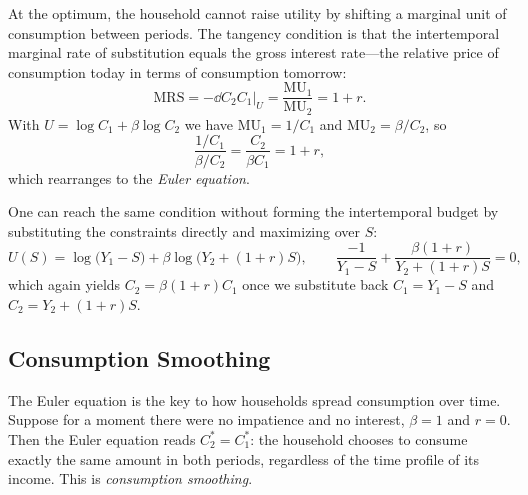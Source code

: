 At the optimum, the household cannot raise utility by shifting a marginal unit of consumption between periods. The tangency condition is that the intertemporal marginal rate of substitution equals the gross interest rate---the relative price of consumption today in terms of consumption tomorrow:
\[
\mathrm{MRS} = -\dd{C_2}{C_1}\bigg|_{U} = \frac{\mathrm{MU}_1}{\mathrm{MU}_2} = 1 + r.
\]
With $U = \log C_1 + \beta \log C_2$ we have $\mathrm{MU}_1 = 1/C_1$ and $\mathrm{MU}_2 = \beta/C_2$, so
\[
\frac{1/C_1}{\beta/C_2} = \frac{C_2}{\beta C_1} = 1 + r,
\]
which rearranges to the \emph{Euler equation}.



One can reach the same condition without forming the intertemporal budget by substituting the constraints directly and maximizing over $S$:
\[
U(S) = \log\!\big(Y_1 - S\big) + \beta \log\!\big(Y_2 + (1+r)S\big),
\qquad
\frac{-1}{Y_1 - S} + \frac{\beta(1+r)}{Y_2 + (1+r)S} = 0,
\]
which again yields $C_2 = \beta(1+r)C_1$ once we substitute back $C_1 = Y_1 - S$ and $C_2 = Y_2 + (1+r)S$.

\subsection{Consumption Smoothing}

The Euler equation is the key to how households spread consumption over time. Suppose for a moment there were no impatience and no interest, $\beta = 1$ and $r = 0$. Then the Euler equation reads $C_2^* = C_1^*$: the household chooses to consume exactly the same amount in both periods, regardless of the time profile of its income. This is \emph{consumption smoothing}.


